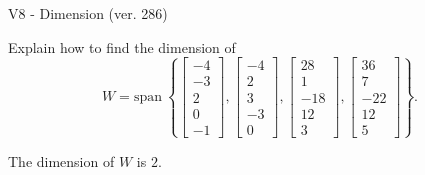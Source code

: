 \begin{exercise}
  \begin{exerciseTitle}V8 - Dimension (ver. 286)\end{exerciseTitle}
  \begin{exerciseStatement}
    Explain how to find the dimension of 
\[W=\mathrm{span}\ \left\{\left[\begin{array}{r}
-4 \\
-3 \\
2 \\
0 \\
-1
\end{array}\right] , \left[\begin{array}{r}
-4 \\
2 \\
3 \\
-3 \\
0
\end{array}\right] , \left[\begin{array}{r}
28 \\
1 \\
-18 \\
12 \\
3
\end{array}\right] , \left[\begin{array}{r}
36 \\
7 \\
-22 \\
12 \\
5
\end{array}\right]\right\}.\]



  \end{exerciseStatement}
  \begin{exerciseAnswer}
   The dimension of \(W\) is  \(2\).
  


  \end{exerciseAnswer}
\end{exercise}